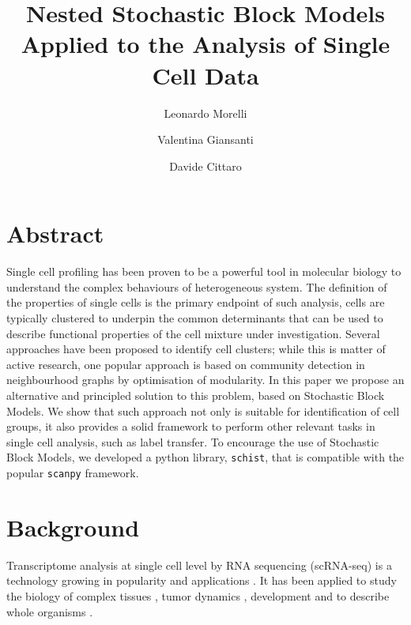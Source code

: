 \documentclass[10pt]{article}
\begin{document}
\title{Nested Stochastic Block Models Applied to the Analysis of Single Cell Data}


\author[1,2]{Leonardo Morelli}
\author[1,3]{Valentina Giansanti}
\author[1,\thanks{Corresponding author: cittaro.davide@hsr.it}]{Davide Cittaro}

\maketitle

\section*{Abstract}

Single cell profiling has been proven to be a powerful tool in molecular biology to understand the complex behaviours of heterogeneous system. The definition of the  properties of single cells is the primary endpoint of such analysis, cells are typically clustered to underpin the common determinants that can be used to describe functional properties of the cell mixture under investigation. Several approaches have been proposed to identify cell clusters; while this is matter of active research, one popular approach is based on community detection in neighbourhood graphs by optimisation of modularity. In this paper we propose an alternative and principled solution to this problem, based on Stochastic Block Models. We show that such approach not only is suitable for identification of cell groups, it also provides a solid framework to perform other relevant tasks in single cell analysis, such as label transfer. To encourage the use of Stochastic Block Models, we developed a python library, \texttt{schist}, that is compatible with the popular \texttt{scanpy} framework.


\section*{Background}

Transcriptome analysis at single cell level by RNA sequencing (scRNA-seq) is a technology growing in popularity and applications \cite{svensson_2018}. It has been applied to study the biology of complex tissues \cite{guo_2018, ventotormo_2018}, tumor dynamics \cite{rozenblattrosen_2020, tirosh_2016, patel_2014, neftel_2019}, development \cite{rosenberg_2018, wagner_2018} and to describe whole organisms \cite{plass_2018, regev_2017}.
\end{document}
